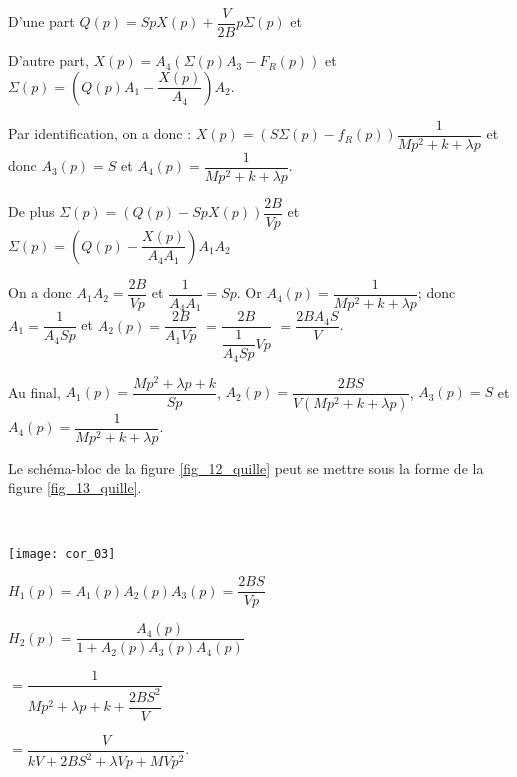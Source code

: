\begin{corrige}
D'une part 
$Q(p) = SpX(p)+\dfrac{V}{2B} p \Sigma(p)$ et


D'autre part, 
$X(p) = A_4 \left( \Sigma(p) A_3 -F_R(p) \right)$ et $\Sigma(p) = \left(Q(p) A_1 - \dfrac{X(p)}{A_4}\right)A_2$.


Par identification, on a donc : 
$ X(p) = \left(S\Sigma(p) -f_R (p)\right)\dfrac{1}{M p^2 +k+ \lambda p}$ et donc $A_3(p) = S$ et $A_4(p)=\dfrac{1}{M p^2 +k+ \lambda p}$.

De plus $\Sigma(p) = \left(Q(p) -  SpX(p)\right)\dfrac{2B}{Vp} $
et $\Sigma(p) =  \left(Q(p)  - \dfrac{X(p)}{A_4A_1}\right)A_1 A_2$

On a donc $A_1 A_2 = \dfrac{2B}{Vp}$ et $\dfrac{1}{A_4A_1} = Sp$.
Or  $A_4(p)=\dfrac{1}{M p^2 +k+ \lambda p}$; donc $A_1 = \dfrac{1}{A_4Sp}$ 
et $A_2(p)= \dfrac{2B}{A_1Vp}$ $= \dfrac{2B}{\dfrac{1}{A_4Sp}Vp}$ $= \dfrac{2BA_4S}{V}$.


Au final,  $A_1(p) = \dfrac{M p^2 + \lambda p+k}{ Sp}$, $A_2(p)=\dfrac{2BS}{V\left( M p^2 +k+ \lambda p\right)}$,
$A_3(p) = S$ et $A_4(p)=\dfrac{1}{M p^2 +k+ \lambda p}$.
\end{corrige}
\else
\fi


\ifprof
\else
Le schéma-bloc de la figure \ref{fig_12_quille} peut se mettre sous la forme de la figure \ref{fig_13_quille}.
\fi

\ifprof
\begin{corrige}~\\
\begin{minipage}[c]{.45\linewidth}
\begin{center}
\texttt{[image: cor\_03]}
\end{center}
\end{minipage} \hfill
\begin{minipage}[c]{.45\linewidth}
$H_1(p)= A_1(p)A_2(p)A_3(p) =\dfrac{2BS}{Vp}$

$H_2(p) = \dfrac{A_4(p)}{1+A_2(p)A_3(p)A_4(p)}$  

$= \dfrac{1}{Mp^2 + \lambda p + k + \dfrac{2BS^2}{V}}$ 

$=\dfrac{V}{kV + 2BS^2 + \lambda V p + MVp^2}$.
 \end{minipage} 
\end{corrige}


